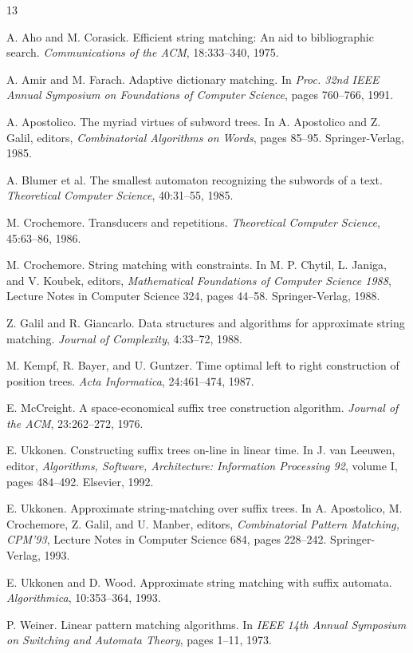 \documentclass[11pt]{article}
\begin{document}
\begin{thebibliography}{13}

A. Aho and M. Corasick.
Efficient string matching: An aid to bibliographic search.
\textit{Communications of the ACM}, 18:333--340, 1975.

A. Amir and M. Farach.
Adaptive dictionary matching.
In \textit{Proc. 32nd IEEE Annual Symposium on Foundations of Computer
Science}, pages 760--766, 1991.

A. Apostolico.
The myriad virtues of subword trees.
In A. Apostolico and Z. Galil, editors, \textit{Combinatorial Algorithms on
Words}, pages 85--95. Springer-Verlag, 1985.

A. Blumer et al.
The smallest automaton recognizing the subwords of a text.
\textit{Theoretical Computer Science}, 40:31--55, 1985.

M. Crochemore.
Transducers and repetitions.
\textit{Theoretical Computer Science}, 45:63--86, 1986.

M. Crochemore.
String matching with constraints.
In M. P. Chytil, L. Janiga, and V. Koubek, editors,
\textit{Mathematical Foundations of Computer Science 1988}, Lecture Notes in
Computer Science 324, pages 44--58. Springer-Verlag, 1988.

Z. Galil and R. Giancarlo.
Data structures and algorithms for approximate string matching.
\textit{Journal of Complexity}, 4:33--72, 1988.

M. Kempf, R. Bayer, and U. Guntzer.
Time optimal left to right construction of position trees.
\textit{Acta Informatica}, 24:461--474, 1987.

E. McCreight.
A space-economical suffix tree construction algorithm.
\textit{Journal of the ACM}, 23:262--272, 1976.

E. Ukkonen.
Constructing suffix trees on-line in linear time.
In J. van Leeuwen, editor, \textit{Algorithms, Software, Architecture:
Information Processing 92}, volume I, pages 484--492. Elsevier, 1992.

E. Ukkonen.
Approximate string-matching over suffix trees.
In A. Apostolico, M. Crochemore, Z. Galil, and U. Manber, editors,
\textit{Combinatorial Pattern Matching, CPM'93}, Lecture Notes in Computer
Science 684, pages 228--242. Springer-Verlag, 1993.

E. Ukkonen and D. Wood.
Approximate string matching with suffix automata.
\textit{Algorithmica}, 10:353--364, 1993.

P. Weiner.
Linear pattern matching algorithms.
In \textit{IEEE 14th Annual Symposium on Switching and Automata Theory},
pages 1--11, 1973.

\end{thebibliography}
\end{document}
